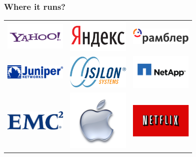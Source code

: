\documentclass{beamer}
\begin{document}
\begin{frame}
\frametitle{Where it runs?}
\begin{center}
\begin{tabular}{ c  c  c }
\includegraphics[width=3cm]{img/yahoo.png} &
\includegraphics[width=3cm]{img/yandex.png} &
\includegraphics[width=3cm]{img/rambler.png} \\
\includegraphics[width=3cm]{img/juniper.png} &
\includegraphics[width=3cm]{img/isilon.png} &
\includegraphics[width=3cm]{img/netapp.png} \\
\includegraphics[width=3cm]{img/emc.png} &
\includegraphics[width=3cm]{img/apple.png} &
\includegraphics[width=3cm]{img/netflix.png} \\
\end{tabular}
\end{center}
\end{frame}
\end{document}
